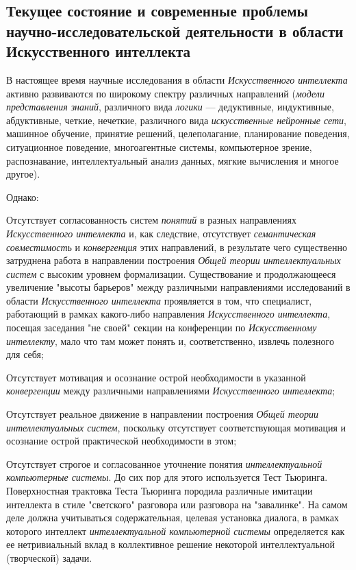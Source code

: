 \subsection{Текущее состояние и современные проблемы научно-исследовательской деятельности в области Искусственного интеллекта}
\label{subsec_current_state_and_modern_problems_research_activities}

В настоящее время научные исследования в области \textit{Искусственного интеллекта} активно развиваются по широкому спектру различных направлений (\textit{модели представления знаний}, различного вида \textit{логики} --- дедуктивные, индуктивные, абдуктивные, четкие, нечеткие, различного вида \textit{искусственные нейронные сети}, машинное обучение, принятие решений, целеполагание, планирование поведения, ситуационное поведение, многоагентные системы, компьютерное зрение, распознавание, интеллектуальный анализ данных, мягкие вычисления и многое другое).

Однако:

\begin{textitemize}
	\item
	Отсутствует согласованность систем \textit{понятий} в разных направлениях \textit{Искусственного интеллекта} и, как следствие, отсутствует \textit{семантическая совместимость} и \textit{конвергенция} этих направлений, в результате чего существенно затруднена работа в направлении построения \textit{Общей теории интеллектуальных систем} с высоким уровнем формализации. Существование и продолжающееся увеличение "высоты барьеров" между различными направлениями исследований в области \textit{Искусственного интеллекта} проявляется в том, что специалист, работающий в рамках какого-либо направления \textit{Искусственного интеллекта}, посещая заседания "не своей" секции на конференции по \textit{Искусственному интеллекту}, мало что там может понять и, соответственно, извлечь полезного для себя;
	\item
	Отсутствует мотивация и осознание острой необходимости в указанной \textit{конвергенции} между различными направлениями \textit{Искусственного интеллекта};
	\item
	Отсутствует реальное движение в направлении построения \textit{Общей теории интеллектуальных систем}, поскольку отсутствует соответствующая мотивация и осознание острой практической необходимости в этом;
	\item
	Отсутствует строгое и согласованное уточнение понятия \textit{интеллектуальной компьютерные системы}. До сих пор для этого используется Тест Тьюринга. Поверхностная трактовка Теста Тьюринга породила различные имитации интеллекта в стиле "светского"{} разговора или разговора на "завалинке"{}. На самом деле должна учитываться содержательная, целевая установка диалога, в рамках которого интеллект \textit{интеллектуальной компьютерной системы} определяется как ее нетривиальный вклад в коллективное решение некоторой интеллектуальной (творческой) задачи.
\end{textitemize}

